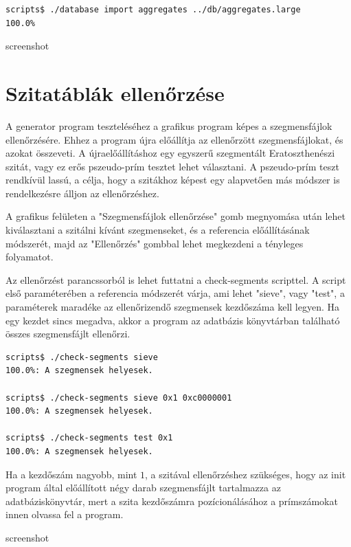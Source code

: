 \documentclass[12pt]{report}
\begin{document}
{\tiny
\begin{lstlisting}[language=bash]
scripts$ ./database import aggregates ../db/aggregates.large
100.0%
\end{lstlisting}
}

{\color{red}screenshot}

\section{Szitatáblák ellenőrzése}

A generator program teszteléséhez a grafikus program képes a szegmensfájlok
ellenőrzésére.
Ehhez a program újra előállítja az ellenőrzött szegmensfájlokat,
és azokat összeveti. A újraelőállításhoz egy egyszerű szegmentált
Eratoszthenészi szitát, vagy ez erős pszeudo-prím tesztet lehet választani.
A pszeudo-prím teszt rendkívül lassú, a célja, hogy a szitákhoz képest egy
alapvetően más módszer is rendelkezésre álljon az ellenőrzéshez.

A grafikus felületen a "Szegmensfájlok ellenőrzése" gomb megnyomása után
lehet kiválasztani a szitálni kívánt szegmenseket, és a referencia előállításának
módszerét, majd az "Ellenőrzés" gombbal lehet megkezdeni a tényleges
folyamatot.

Az ellenőrzést parancssorból is lehet futtatni a check-segments scripttel.
A script első paraméterében a referencia módszerét várja,
ami lehet "sieve", vagy "test", a paraméterek maradéke az ellenőrizendő
szegmensek kezdőszáma kell legyen. Ha egy kezdet sincs megadva, akkor
a program az adatbázis könyvtárban található összes szegmensfájlt ellenőrzi.

{\tiny
\begin{lstlisting}[language=bash]
scripts$ ./check-segments sieve
100.0%: A szegmensek helyesek.             

scripts$ ./check-segments sieve 0x1 0xc0000001
100.0%: A szegmensek helyesek.             

scripts$ ./check-segments test 0x1
100.0%: A szegmensek helyesek.             

\end{lstlisting}
}

Ha a kezdőszám nagyobb, mint $1$, a szitával ellenőrzéshez szükséges,
hogy az init program által előállított négy darab szegmensfájlt tartalmazza
az adatbáziskönyvtár, mert a szita kezdőszámra pozícionálásához a prímszámokat
innen olvassa fel a program.

{\color{red}screenshot}
\end{document}
